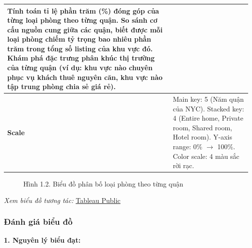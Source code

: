 \begin{table}[H]
\begin{tabularx}{\textwidth}{|l|l|X|}
{Tính toán tỉ lệ phần trăm (\%) đóng góp của từng loại phòng theo từng quận. So sánh cơ cấu nguồn cung giữa các quận, biết được mỗi loại phòng chiếm tỷ trọng bao nhiêu phần trăm trong tổng số listing của khu vực đó. Khám phá đặc trưng phân khúc thị trường của từng quận (ví dụ: khu vực nào chuyên phục vụ khách thuê nguyên căn, khu vực nào tập trung phòng chia sẻ giá rẻ).
} \\ \hline
\textbf{Scale} & \multicolumn{2}{X|}{
Main key: 5 (Năm quận của NYC). \newline
Stacked key: 4 (Entire home, Private room, Shared room, Hotel room). \newline
Y-axis range: 0\% $\rightarrow$ 100\%. Color scale: 4 màu sắc rời rạc.
} \\ \hline
\end{tabularx}
\end{table}

\begin{figure}[H]
    \centering
    \caption{Hình 1.2. Biểu đồ phân bố loại phòng theo từng quận}
    \label{fig:domain-task1-chart2}
\end{figure}

\noindent\small\textit{Xem biểu đồ tương tác: }\href{https://public.tableau.com/app/profile/duy.le4605/viz/Group10_17788537028430/Task1_2-Roomtypesarecategorizedbydistrict?publish=yes}{Tableau Public}\normalsize

\subsubsection{Đánh giá biểu đồ}

\textbf{1. Nguyên lý biểu đạt:}

